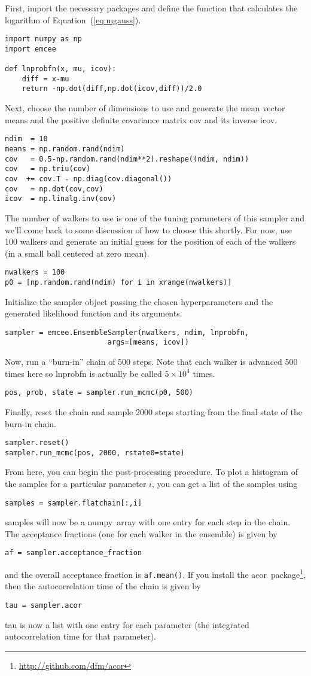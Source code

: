 \documentclass[12pt,preprint]{aastex}
\newcommand{\project}[1]{{\sffamily #1}}
\newcommand{\numpy}{\project{numpy}}
\newcommand{\acor}{\project{acor}}
\newcommand{\code}[1]{{\sffamily #1}}
\newcommand{\Eq}[1]{Equation~(\ref{eq:#1})}
\newcommand{\eq}[1]{\Eq{#1}}
\begin{document}
First, import the necessary packages and define the function that calculates
the logarithm of \eq{mgauss}.
\begin{lstlisting}
import numpy as np
import emcee

def lnprobfn(x, mu, icov):
    diff = x-mu
    return -np.dot(diff,np.dot(icov,diff))/2.0
\end{lstlisting}
Next, choose the number of dimensions to use and generate the mean vector
\code{means} and the positive definite covariance matrix \code{cov} and its
inverse \code{icov}.
\begin{lstlisting}
ndim  = 10
means = np.random.rand(ndim)
cov   = 0.5-np.random.rand(ndim**2).reshape((ndim, ndim))
cov   = np.triu(cov)
cov  += cov.T - np.diag(cov.diagonal())
cov   = np.dot(cov,cov)
icov  = np.linalg.inv(cov)
\end{lstlisting}
The number of walkers to use is one of the tuning parameters of this sampler
and we'll come back to some discussion of how to choose this shortly. For
now, use 100 walkers and generate an initial guess for the position of each
of the walkers (in a small ball centered at zero mean).
\begin{lstlisting}
nwalkers = 100
p0 = [np.random.rand(ndim) for i in xrange(nwalkers)]
\end{lstlisting}
Initialize the sampler object passing the chosen hyperparameters and the
generated likelihood function and its arguments.
\begin{lstlisting}
sampler = emcee.EnsembleSampler(nwalkers, ndim, lnprobfn,
                        args=[means, icov])
\end{lstlisting}
Now, run a ``burn-in'' chain of 500 steps. Note that each walker is advanced
500 times here so \code{lnprobfn} is actually be called $5\times10^4$ times.
\begin{lstlisting}
pos, prob, state = sampler.run_mcmc(p0, 500)
\end{lstlisting}
Finally, reset the chain and sample 2000 steps starting from the final state
of the burn-in chain.
\begin{lstlisting}
sampler.reset()
sampler.run_mcmc(pos, 2000, rstate0=state)
\end{lstlisting}
From here, you can begin the post-processing procedure. To plot a
histogram of the samples for a particular parameter $i$, you can
get a list of the samples using
\begin{lstlisting}
samples = sampler.flatchain[:,i]
\end{lstlisting}
\code{samples} will now be a \numpy\ array with one entry for each step in
the chain. The acceptance fractions (one for each walker in the ensemble)
is given by
\begin{lstlisting}
af = sampler.acceptance_fraction
\end{lstlisting}
and the overall acceptance fraction is \texttt{af.mean()}. If you install
the \acor\ package\footnote{\url{http://github.com/dfm/acor}}, then the
autocorrelation time of the chain is given by
\begin{lstlisting}
tau = sampler.acor
\end{lstlisting}
\code{tau} is now a list with one entry for each parameter (the
integrated autocorrelation time for that parameter).
\end{document}
